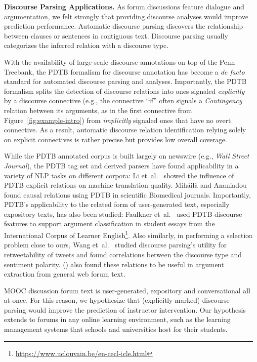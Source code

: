 \documentclass[letterpaper]{article}
\begin{document}
\textbf{Discourse Parsing Applications.} As forum discussions feature
dialogue and argumentation, we felt strongly that providing discourse
analyses would improve prediction performance. Automatic discourse
parsing discovers the relationship between clauses or sentences in
contiguous text. Discourse parsing usually categorizes the inferred 
relation with a discourse type.

With the availability of large-scale discourse annotations on top of
the Penn Treebank, the PDTB formalism for
discourse annotation has become a {\it de facto} standard for
automated discourse parsing and analyses. Importantly, the PDTB
formalism splits the detection of discourse relations into ones
signaled {\it explicitly} by a discourse connective (e.g., the
connective ``if'' often signals a {\it Contingency} relation between
its arguments, as in the first connective from
Figure~\ref{fig:example-intro}) from {\it implicitly} signaled ones
that have no overt connective. As a result, automatic discourse
relation identification relying solely on explicit connectives is
rather precise but provides low overall coverage.

While the PDTB annotated corpus is built largely on newswire (e.g.,
{\it Wall Street Journal}), the PDTB tag set and derived parsers have
found applicability in a variety of NLP tasks on different corpora: Li
et~al.~ showed the influence of PDTB explicit
relations on machine translation quality.  Mih{\u{a}}il{\u{a}} and
Ananiadou~ found causal relations using PDTB
in scientific Biomedical journals.  Importantly, PDTB's applicability
to the related form of user-generated text, especially expository
texts, has also been studied: Faulkner
et~al.~ used PDTB discourse features
to support argument classification in student essays from the
International Corpus of Learner
English\footnote{\url{https://www.uclouvain.be/en-cecl-icle.html}}.
Also similarly, in performing a selection problem close to ours, Wang
et~al.~ studied discourse parsing's utility for
retweetability of tweets and found correlations between the discourse
type and sentiment polarity.  \citeauthor{swanson2015}
(\citeyear{swanson2015}) also found these relations to be useful in
argument extraction from general web forum text.

MOOC discussion forum text is user-generated, expository and
conversational all at once. For this reason, we hypothesize that
(explicitly marked) discourse parsing would improve the prediction of
instructor intervention. Our hypothesis extends to forums in any
online learning environment, such as the learning management systems
that schools and universities host for their students.
\end{document}
